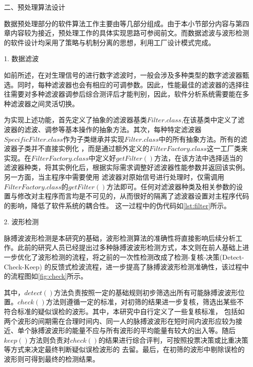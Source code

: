 % 

二、预处理算法设计

数据预处理部分的软件算法工作主要由等几部分组成。由于本小节部分内容与第四章内容较为接近，预处理工作的具体实现思路可参阅前文。而数据滤波与波形检测的软件设计均采用了策略与机制分离的思想，利用工厂设计模式\cite{Enrich2018}完成。

1. 数据滤波

如前所述，在对生理信号的进行数字滤波时，一般会涉及多种类型的数字滤波器甄选。同时，每种滤波器也会有相应的可调参数。因此，性能最佳的滤波器的选择往往需要对多种滤波器调参后综合测评后才能判别，因此，软件分析系统需要能在多种滤波器之间灵活切换。

为实现上述功能，首先定义了抽象的滤波器基类$Filter.class$,在该基类中定义了滤波器的滤波、调参等基本操作的抽象方法。其次，每种特定滤波器$SpecificFilter.class$作为子类继承并实现$Filter.class$中的所有抽象方法。所有的滤波器子类并不直接实例化
，而是通过额外定义的$FilterFactory.class$这一工厂类来实现。在$FilterFactory.class$中定义好$getFilter()$方法，在该方法中选择适当的滤波器种类，将其实例化后，根据实际需求调整好滤波器性能参数并返回该实例。另一方面，当主程序中需要使用
滤波器对原始信号进行处理时，仅需调用$FilterFactory.class$的$getFilter()$方法即可。任何对滤波器种类及相关参数的设置与修改对主程序而言均是不可见的，从而很好的隔离了滤波器设置对主程序代码的影响，降低了软件系统的耦合性。
这一过程中的伪代码如\autoref{lst:filter}所示。
% 

2. 波形检测

脉搏波波形检测是本研究的基础，波形检测算法的准确性将直接影响后续分析工作。此前的研究人员已经提出过多种脉搏波波形检测方式\cite{Wang2012}，本文则在前人基础上进一步优化了波形检测的流程，将之前的一次性检测改成了检测-复核-决策(Detect-Check-Keep)
的反馈式检波流程，进一步提高了脉搏波波形检测准确性，该过程中的流程图如\autoref{fig:check}所示。

其中，$detect()$方法负责按照一定的基础规则初步筛选出所有可能脉搏波波形位置。$check()$方法则遵循一定的标准，对初筛的结果进一步复核，筛选出某些不符合标准的疑似误检的波形。其中，本研究中自行定义了一些复核标准，
包括如两个波形的间期需在合理时间内、同一人的脉搏波波形在短时间内波形应较为接近、单个脉搏波波形的能量不应与所有波形的平均能量有较大的出入等。随后$keep()$方法则负责对$check()$的结果进行综合评判，可按照投票决策或比重决策等方式来决定最终判断疑似误检波形的
去留。最后，在初筛的波形中剔除误检的波形则可得到最终的检测结果。

